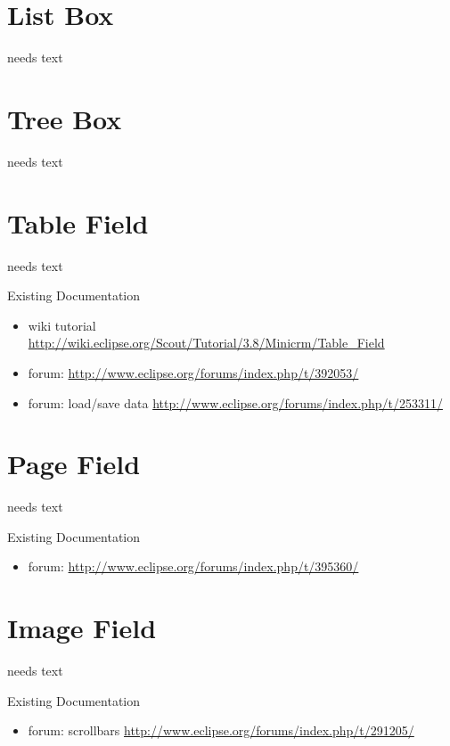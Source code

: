 \documentclass[a4paper,10pt,twoside]{book}
\begin{document}
\section{List Box}
needs text

\section{Tree Box}
needs text

\section{Table Field}
needs text

\noindent Existing Documentation
\begin{itemize}
  \item wiki tutorial \url{http://wiki.eclipse.org/Scout/Tutorial/3.8/Minicrm/Table_Field}
  \item forum: \url{http://www.eclipse.org/forums/index.php/t/392053/}
  \item forum: load/save data \url{http://www.eclipse.org/forums/index.php/t/253311/}
\end{itemize}

\section{Page Field}
needs text

\noindent Existing Documentation
\begin{itemize}
  \item forum: \url{http://www.eclipse.org/forums/index.php/t/395360/}
\end{itemize}

\section{Image Field}
needs text

\noindent Existing Documentation
\begin{itemize}
  \item forum: scrollbars \url{http://www.eclipse.org/forums/index.php/t/291205/}
\end{itemize}
\end{document}
